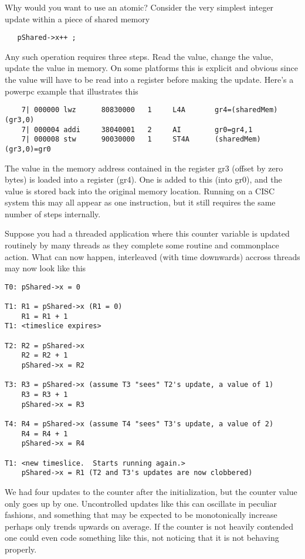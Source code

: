 Why would you want to use an atomic?  Consider the very simplest integer update within a piece of shared memory

\begin{lstlisting}
   pShared->x++ ;
\end{lstlisting}

Any such operation requires three steps.  Read the value, change the value, update the value in memory.  On some platforms this is explicit and obvious since the value will have to be read into a register before making the update.  Here's a powerpc example that illustrates this

\begin{lstlisting}
    7| 000000 lwz      80830000   1     L4A       gr4=(sharedMem)(gr3,0)
    7| 000004 addi     38040001   2     AI        gr0=gr4,1
    7| 000008 stw      90030000   1     ST4A      (sharedMem)(gr3,0)=gr0
\end{lstlisting}

The value in the memory address contained in the register gr3 (offset by zero bytes) is loaded into a register (gr4).  One is added to this (into gr0), and the value is stored back into the original memory location.  Running on a CISC system this may all appear as one instruction, but it still requires the same number of steps internally.

Suppose you had a threaded application where this counter variable is updated routinely by many threads as they complete some routine and commonplace action.  What can now happen, interleaved (with time downwards) accross threads may now look like this

\begin{lstlisting}
T0: pShared->x = 0

T1: R1 = pShared->x (R1 = 0)
    R1 = R1 + 1
T1: <timeslice expires>

T2: R2 = pShared->x
    R2 = R2 + 1
    pShared->x = R2

T3: R3 = pShared->x (assume T3 "sees" T2's update, a value of 1)
    R3 = R3 + 1
    pShared->x = R3

T4: R4 = pShared->x (assume T4 "sees" T3's update, a value of 2)
    R4 = R4 + 1
    pShared->x = R4

T1: <new timeslice.  Starts running again.>
    pShared->x = R1 (T2 and T3's updates are now clobbered)
\end{lstlisting}

We had four updates to the counter after the initialization, but the counter value only goes up by one.  Uncontrolled updates like this can oscillate in peculiar fashions, and something that may be expected to be monotonically increase perhaps only trends upwards on average.  If the counter is not heavily contended one could even code something like this, not noticing that it is not behaving properly.

